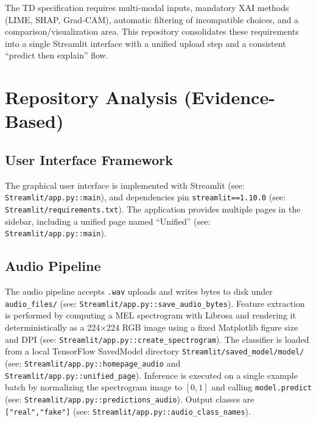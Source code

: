 \documentclass[11pt,a4paper]{article}
\begin{document}
The TD specification requires multi-modal inputs, mandatory XAI methods (LIME, SHAP, Grad-CAM), automatic filtering of incompatible choices, and a comparison/visualization area. This repository consolidates these requirements into a single Streamlit interface with a unified upload step and a consistent ``predict then explain'' flow.

\section{Repository Analysis (Evidence-Based)}
\subsection{User Interface Framework}
The graphical user interface is implemented with Streamlit (see: \texttt{Streamlit/app.py::main}), and dependencies pin \texttt{streamlit==1.10.0} (see: \texttt{Streamlit/requirements.txt}). The application provides multiple pages in the sidebar, including a unified page named ``Unified'' (see: \texttt{Streamlit/app.py::main}).

\subsection{Audio Pipeline}
The audio pipeline accepts \texttt{.wav} uploads and writes bytes to disk under \texttt{audio\_files/} (see: \texttt{Streamlit/app.py::save\_audio\_bytes}). Feature extraction is performed by computing a MEL spectrogram with Librosa and rendering it deterministically as a 224$\times$224 RGB image using a fixed Matplotlib figure size and DPI (see: \texttt{Streamlit/app.py::create\_spectrogram}). The classifier is loaded from a local TensorFlow SavedModel directory \texttt{Streamlit/saved\_model/model/} (see: \texttt{Streamlit/app.py::homepage\_audio} and \texttt{Streamlit/app.py::unified\_page}). Inference is executed on a single example batch by normalizing the spectrogram image to $[0,1]$ and calling \texttt{model.predict} (see: \texttt{Streamlit/app.py::predictions\_audio}). Output classes are \texttt{["real","fake"]} (see: \texttt{Streamlit/app.py::audio\_class\_names}).
\end{document}

